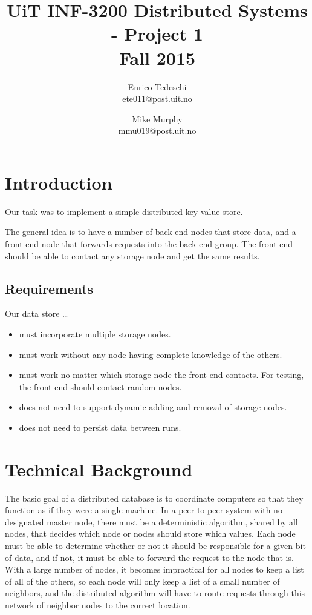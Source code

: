\documentclass[11pt,conference]{IEEEtran}
\title{UiT INF-3200 Distributed Systems - Project 1\\Fall 2015}
\author{Enrico Tedeschi\\ete011@post.uit.no
    \and Mike Murphy\\mmu019@post.uit.no}
\begin{document}
\maketitle


\section{Introduction}

Our task was to implement a simple distributed key-value store.

The general idea is to have a number of back-end nodes that store data, and a
front-end node that forwards requests into the back-end group. The front-end
should be able to contact any storage node and get the same results.


\subsection{Requirements}

Our data store \ldots

\begin{itemize}
\item must incorporate multiple storage nodes.
\item must work without any node having complete knowledge of the others.
\item must work no matter which storage node the front-end contacts. For
    testing, the front-end should contact random nodes.
\item does not need to support dynamic adding and removal of storage nodes.
\item does not need to persist data between runs.
\end{itemize}


\section{Technical Background}

The basic goal of a distributed database is to coordinate computers so that they
function as if they were a single machine. In a peer-to-peer system with no
designated master node, there must be a deterministic algorithm, shared by all
nodes, that decides which node or nodes should store which values. Each node
must be able to determine whether or not it should be responsible for a given
bit of data, and if not, it must be able to forward the request to the node that
is. With a large number of nodes, it becomes impractical for all nodes to keep a
list of all of the others, so each node will only keep a list of a small number
of neighbors, and the distributed algorithm will have to route requests through
this network of neighbor nodes to the correct location. \cite{p2plookup}
\end{document}
